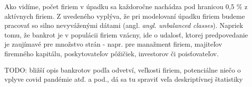 Ako vidíme, počet firiem v úpadku sa každoročne nachádza pod hranicou 0,5 \% z aktívnych firiem.
Z uvedeného vyplýva, že pri modelovaní úpadku firiem budeme pracovať so silno nevyváženými dátami (angl. \emph{angl. unbalanced classes}).
Napriek tomu, že bankrot je v populácii firiem vzácny, ide o udalosť, ktorej predpovedanie je zaujímavé pre množstvo strán -
napr. pre manažment firiem, majiteľov firemného kapitálu, poskytovateľov pôžičiek, investorov či poisťovateľov.

TODO: bližší opis bankrotov podľa odvetví, veľkosti firiem, potenciálne niečo o vplyve covid pandémie atď. a pod.,
dá sa tu spraviť veľa deskriptívnej štatistiky